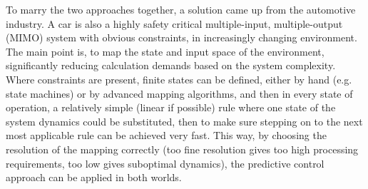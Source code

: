 To marry the two approaches together, a solution came up from the automotive industry. A car is also a highly safety critical multiple-input, multiple-output (MIMO) system with obvious constraints, in increasingly changing environment. The main point is, to map the state and input space of the environment, significantly reducing calculation demands based on the system complexity. Where constraints are present, finite states can be defined, either by hand (e.g. state machines) or by advanced mapping algorithms, and then in every state of operation, a relatively simple (linear if possible)  rule where one state of the system dynamics could be substituted, then to make sure stepping on to the next most applicable rule can be achieved very fast. This way, by choosing the resolution of the mapping correctly (too fine resolution gives too high processing requirements, too low gives suboptimal dynamics), the predictive control approach can be applied in both worlds.\\


